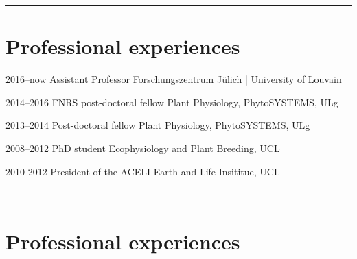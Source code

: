 \documentclass[]{friggeri-cv} %
\begin{document}

\rule{\linewidth}{0.5pt}
\section{Professional experiences}

\begin{entrylist}

\entry
{2016--now}
{Assistant Professor}
{Forschungszentrum Jülich | University of Louvain}
{}

\entry
{2014--2016}
{FNRS post-doctoral fellow}
{Plant Physiology, PhytoSYSTEMS, ULg}
{}

\entry
{2013--2014}
{Post-doctoral fellow}
{Plant Physiology, PhytoSYSTEMS, ULg}
{}

\entry
{2008--2012}
{PhD student}
{Ecophysiology and Plant Breeding, UCL}
{}

\entry
{2010-2012}
{President of the ACELI}
{Earth and Life Insititue, UCL}
{}

\end{entrylist}







\newpage
~

\section{Professional experiences}
\end{document}
